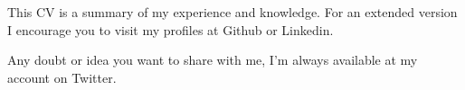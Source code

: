 This CV is a summary of my experience and knowledge. For an extended version I encourage you to visit my profiles at Github or Linkedin.

Any doubt or idea you want to share with me, I'm always available at my account on Twitter.
